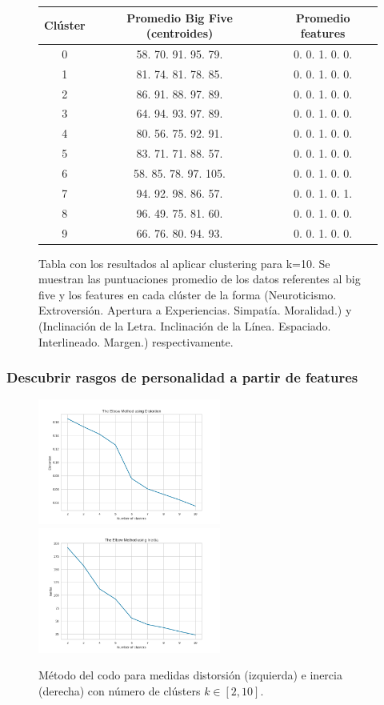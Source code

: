\documentclass[10pt, a4paper]{article}
\begin{document}
		\begin{figure}[H]
			\centering
			\begin{tabular}[H]{|c|c|c|}
			\hline Cl\'uster & Promedio Big Five (centroides) & Promedio features \\  
			\hline 0 & 58. 70. 91. 95. 79. & 0. 0. 1. 0. 0. \\
			\hline 1 & 81. 74. 81. 78. 85. & 0. 0.  1.  0.  0. \\
			\hline 2 & 86. 91. 88. 97. 89. & 0. 0.  1.  0.  0. \\
			\hline 3 & 64. 94. 93. 97. 89. & 0.  0.  1.  0.  0.\\
			\hline 4 & 80. 56. 75. 92. 91. & 0. 0. 1. 0. 0.\\
			\hline 5 & 83. 71. 71. 88. 57. & 0. 0.  1.  0.  0.\\
			\hline 6 & 58.  85.  78.  97. 105. & 0. 0. 1. 0. 0.\\
			\hline 7 & 94. 92. 98. 86. 57. & 0. 0.  1.  0.  1.\\
			\hline 8 & 96. 49. 75. 81. 60. & 0. 0.  1.  0.  0. \\
			\hline 9 & 66. 76. 80. 94. 93. & 0.  0.  1.  0.  0.\\
			\hline
		\end{tabular}
			\caption{Tabla con los resultados al aplicar clustering para k=10. Se muestran las puntuaciones promedio de los datos referentes al big five y los features en cada cl\'uster de la forma (Neuroticismo. Extroversi\'on. Apertura a Experiencias. Simpat\'ia. Moralidad.) y (Inclinaci\'on de la Letra. Inclinaci\'on de la L\'inea. Espaciado. Interlineado. Margen.) respectivamente.}
		\end{figure}
		
		
		\subsubsection{Descubrir rasgos de personalidad a partir de features}
    	
   		\begin{figure}[H]
    		\centering
    		\includegraphics[width = 6cm]{ElbowM_Distortion.png}
    		\includegraphics[width = 6cm]{ElbowM_Inertia.png}
    		\caption{M\'etodo del codo para medidas distorsi\'on (izquierda) e inercia (derecha) con n\'umero de cl\'usters $k\in[2, 10]$.}
    	\end{figure}
\end{document}

